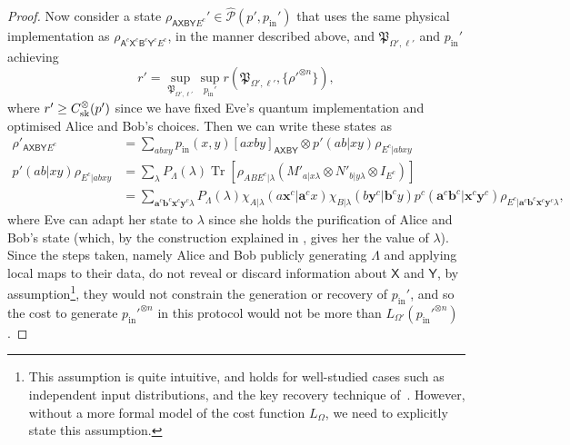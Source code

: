 \documentclass[10pt, a4paper]{article}
\numberwithin{equation}{section} %
\theoremstyle{definition}
\theoremstyle{plain}
\newcommand{\?}{\mathrel{?}} %
\newcommand{\cvec}[1]{\boldsymbol{\mathbf{#1}}}    %
\newcommand{\Tr}[2][]{\mathop{\mathrm{Tr}#1}\left[ #2 \right]} %
\newcommand{\crv}[1]{\mathsf{#1}}
\newcommand{\proj}[2][]{{[#2]}_{#1}}
\newcommand{\compatstates}[3][]{\hat{\mathcal{P}}#1(#2,#3)}
\newcommand{\proto}[2][\ell]{\mathfrak{P}_{#2, #1}}
\newcommand{\prin}[1][p]{#1_{\mathrm{in}}}
\newcommand{\sk}{\rm sk}
\begin{document}
\begin{proof}
                        Now consider a state \(\rho_{\crv{AXBY}{E^c}}' \in \compatstates{p'}{\prin'}\) that uses the same physical implementation as \(\rho_{\crv{A}^c\crv{X}^c \crv{B}^c\crv{Y}^c E^c}\), in the manner described above, and \(\proto[\ell']{\Omega'}\) and \(\prin'\) achieving
                        \[
                          r' = \sup_{\proto[\ell']{\Omega'}} \sup_{\prin'} r(\proto[\ell']{\Omega'}, \{\rho'^{\otimes{n}}\}),
                        \]
                        where \(r' \geq C_{\sk}^{\otimes}(p')\) since we have fixed Eve's quantum implementation and optimised Alice and Bob's choices. Then we can write these states as
                        \begin{align*}
                          \rho'_{\crv{A}\crv{X} \crv{B}\crv{Y} E^c} &= \sum_{abxy} \prin(x,y) \proj[\crv{A}\crv{X} \crv{B}\crv{Y}]{axby} \otimes p'(ab|xy) \rho_{E^c|abxy} \\
                          p'(ab|xy) \rho_{E^c|abxy} &= \sum_{\lambda} P_{\Lambda}(\lambda) \Tr{ \rho_{ABE^c|\lambda} \left( M'_{a|x\lambda} \otimes N'_{b|y\lambda} \otimes I_{E^c} \right) } \\
                                                  &= \sum_{\cvec{a}^c\cvec{b}^c\cvec{x}^c\cvec{y}^c\lambda}
                                                  P_{\Lambda}(\lambda) \chi_{A|\lambda}(a\cvec{x}^c|\cvec{a}^cx) \chi_{B|\lambda}(b\cvec{y}^c|\cvec{b}^cy)
                                                  p^c(\cvec{a}^c\cvec{b}^c|\cvec{x}^c\cvec{y}^c)
                                                  \rho_{E^c|\cvec{a}^c\cvec{b}^c \cvec{x}^c\cvec{y}^c\lambda},
                        \end{align*}
                        where Eve can adapt her state to \(\lambda\) since she holds the purification of Alice and Bob's state (which, by the construction explained in , gives her the value of \(\lambda\)). Since the steps taken, namely Alice and Bob publicly generating \(\Lambda\) and applying local maps to their data, do not reveal or discard information about \(\crv{X}\) and \(\crv{Y}\), by assumption\footnote{This assumption is quite intuitive, and holds for well-studied cases such as independent input distributions, and the key recovery technique of~\cite[Prot. 2]{DIQKD_FiniteSize}. However, without a more formal model of the cost function \(L_{\Omega}\), we need to explicitly state this assumption.}, they would not constrain the generation or recovery of \(\prin'\), and so the cost to generate \(\prin'^{\otimes n}\) in this protocol would not be more than \(L_{\Omega'}(\prin'^{\otimes n})\).


\end{proof}
\end{document}
